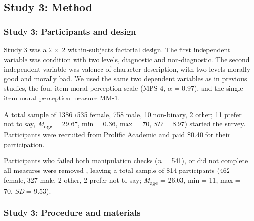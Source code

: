 \documentclass[
  man,floatsintext]{apa7}
\begin{document}
\subsection{Study 3: Method}\label{study-3-method}

\subsubsection{Study 3: Participants and design}\label{study-3-participants-and-design}

Study 3 was a 2 \(\times\) 2 within-subjects factorial design. The first independent variable was condition with two levels, diagnostic and non-diagnostic. The second independent variable was valence of character description, with two levels morally good and morally bad. We used the same two dependent variables as in previous studies, the four item moral perception scale (MPS-4, \(\alpha\) = 0.97), and the single item moral perception measure MM-1.

A total sample of 1386 (535 female, 758 male, 10 non-binary, 2 other; 11 prefer not to say, \emph{M}\textsubscript{age} = 29.67, min = 0.36, max = 70, \emph{SD} = 8.97) started the survey. Participants were recruited from Prolific Academic and paid \$0.40 for their participation.

Participants who failed both manipulation checks (\emph{n} = 541), or did not complete all measures were removed , leaving a total sample of 814 participants (462 female, 327 male, 2 other, 2 prefer not to say; \emph{M}\textsubscript{age} = 26.03, min = 11, max = 70, \emph{SD} = 9.53).

\subsubsection{Study 3: Procedure and materials}\label{study-3-procedure-and-materials}
\end{document}
